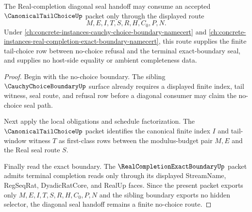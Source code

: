 \begin{theorem}
\label{thm:canonical-tail-choice-real-completion-handoff}
The Real-completion diagonal seal handoff may consume an accepted $\CanonicalTailChoiceUp$ packet only through the displayed route
$$
M,E,I,T,S,R,H,C_0,P,N.
$$
Under \autoref{ch:concrete-instances-cauchy-choice-boundary-namecert} and \autoref{ch:concrete-instances-real-completion-exact-boundary-namecert}, this route supplies the finite tail-choice row between no-choice refusal and the terminal exact-boundary seal, and supplies no host-side equality or ambient completeness data.
\end{theorem}
\begin{proof}
Begin with the no-choice boundary. The sibling $\CauchyChoiceBoundaryUp$ surface already requires a displayed finite index, tail witness, seal route, and refusal row before a diagonal consumer may claim the no-choice seal path.

Next apply the local obligations and schedule factorization. The $\CanonicalTailChoiceUp$ packet identifies the canonical finite index $I$ and tail-window witness $T$ as first-class rows between the modulus-budget pair $M,E$ and the Real seal route $S$.

Finally read the exact boundary. The $\RealCompletionExactBoundaryUp$ packet admits terminal completion reads only through its displayed StreamName, RegSeqRat, DyadicRatCore, and RealUp faces. Since the present packet exports only $M,E,I,T,S,R,H,C_0,P,N$ and the sibling boundary exports no hidden selector, the diagonal seal handoff remains a finite no-choice route.
\end{proof}

